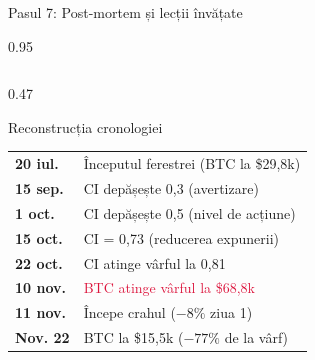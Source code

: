 \documentclass[9pt, aspectratio=169, t]{beamer}
\begin{document}
\begin{frame}{Pasul 7: Post-mortem și lecții învățate}
    \begin{cminipage}{0.95\textwidth}
    {\footnotesize
    \begin{columns}[T]
        \begin{column}{0.47\textwidth}
            \begin{block}{Reconstrucția cronologiei}
                \begin{tabular}{ll}
                    \textbf{20 iul.} & Începutul ferestrei (BTC la \$29,8k) \\
                    \textbf{15 sep.} & CI depășește 0,3 (avertizare) \\
                    \textbf{1 oct.} & CI depășește 0,5 (nivel de acțiune) \\
                    \textbf{15 oct.} & CI = 0,73 (reducerea expunerii) \\
                    \textbf{22 oct.} & CI atinge vârful la 0,81 \\
                    \textbf{10 nov.} & \textcolor{Crimson}{BTC atinge vârful la \$68,8k} \\
                    \textbf{11 nov.} & Începe crahul ($-8\%$ ziua 1) \\
                    \textbf{Nov. 22} & BTC la \$15,5k ($-77\%$ de la vârf) \\
                \end{tabular}
            \end{block}


\end{column}
\end{columns}}
\end{cminipage}
\end{frame}
\end{document}
